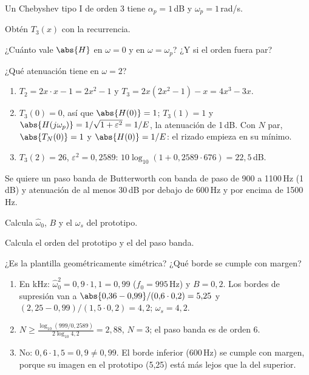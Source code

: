 \documentclass[11pt,a4paper]{scrartcl}
\begin{document}
\begin{ejercicio}
  Un Chebyshev tipo I de orden 3 tiene $\alpha_p=1$\,dB y $\omega_p=1$\,rad/s.
  \begin{incisos}[1]
    \item Obtén $T_3(x)$ con la recurrencia.
    \item ¿Cuánto vale $\abs{H}$ en $\omega=0$ y en $\omega=\omega_p$? ¿Y si el orden fuera par?
    \item ¿Qué atenuación tiene en $\omega=2$?
  \end{incisos}
\end{ejercicio}
\begin{solucion}
  \begin{enumerate}[label=\alph*)]
    \item $T_2=2x\cdot x-1=2x^2-1$ y $T_3=2x(2x^2-1)-x=4x^3-3x$.
    \item $T_3(0)=0$, así que $\abs{H(0)}=1$; $T_3(1)=1$ y $\abs{H(j\omega_p)}=1/\sqrt{1+\varepsilon^2}=1/E$, la atenuación de 1\,dB. Con $N$ par, $\abs{T_N(0)}=1$ y $\abs{H(0)}=1/E$: el rizado empieza en su mínimo.
    \item $T_3(2)=26$, $\varepsilon^2=0{,}2589$: $10\log_{10}(1+0{,}2589\cdot676)=22{,}5$\,dB.
  \end{enumerate}
\end{solucion}

\begin{ejercicio}
  Se quiere un paso banda de Butterworth con banda de paso de 900 a 1100\,Hz (1\,dB) y atenuación de al menos 30\,dB por debajo de 600\,Hz y por encima de 1500\,Hz.
  \begin{incisos}[1]
    \item Calcula $\hat\omega_0$, $B$ y el $\omega_s$ del prototipo.
    \item Calcula el orden del prototipo y el del paso banda.
    \item ¿Es la plantilla geométricamente simétrica? ¿Qué borde se cumple con margen?
  \end{incisos}
\end{ejercicio}
\begin{solucion}
  \begin{enumerate}[label=\alph*)]
    \item En kHz: $\hat\omega_0^2=0{,}9\cdot1{,}1=0{,}99$ ($f_0=995$\,Hz) y $B=0{,}2$. Los bordes de supresión van a $\abs{0{,}36-0{,}99}/(0{,}6\cdot0{,}2)=5{,}25$ y $(2{,}25-0{,}99)/(1{,}5\cdot0{,}2)=4{,}2$; $\omega_s=4{,}2$.
    \item $N\ge\frac{\log_{10}(999/0{,}2589)}{2\log_{10}4{,}2}=2{,}88$, $N=3$; el paso banda es de orden 6.
    \item No: $0{,}6\cdot1{,}5=0{,}9\ne0{,}99$. El borde inferior (600\,Hz) se cumple con margen, porque su imagen en el prototipo (5,25) está más lejos que la del superior.
  \end{enumerate}
\end{solucion}
\end{document}
